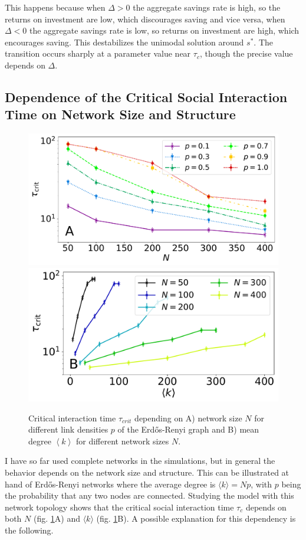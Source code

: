 This happens because when $\Delta > 0$ the aggregate savings rate is high, so the returns on investment are low, which discourages saving and vice versa, when $\Delta < 0$ the aggregate savings rate is low, so returns on investment are high, which encourages saving. 
This destabilizes the unimodal solution around $s^\ast$. 
The transition occurs sharply at a parameter value near $\tau_{c}$, though the precise value depends on $\Delta$.
\newpage
\subsection{Dependence of the Critical Social Interaction Time on Network Size and Structure}  
\label{sec:savings_network_structure}

\begin{figure}
  \centering
  \includegraphics[width = .6 \textwidth]{figures/taucrit_N2.pdf}
  \includegraphics[width = .6 \textwidth]{figures/taucrit_N_k.pdf}
\caption{Critical interaction time $\tau_{crit}$ depending on A) network size $N$ for different link densities $p$ of the Erd\H{o}s-Renyi graph and B) mean degree $\left< k \right>$ for different network sizes $N$.}
  \label{fig:taucrit}
\end{figure}
I have so far used complete networks in the simulations, but in general the behavior depends on the network size and structure. This can be illustrated at hand of Erd\H{o}s-Renyi networks where the average degree is $\langle k \rangle = Np$, with $p$ being the probability that any two nodes are connected. Studying the model with this network topology shows that the critical social interaction time $\tau_{c}$ depends on both $N$ (fig. \ref{fig:taucrit}A) and $\langle k \rangle$ (fig. \ref{fig:taucrit}B). A possible explanation for this dependency is the following.
